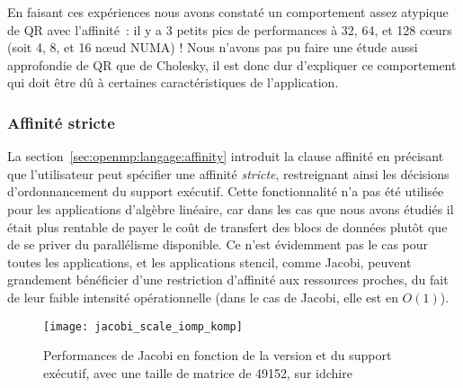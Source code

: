 En faisant ces expériences nous avons constaté un comportement assez atypique de QR avec l'affinité~: il y a 3 petits pics de performances à 32, 64, et 128 cœurs (soit 4, 8, et 16 nœud NUMA) !
Nous n'avons pas pu faire une étude aussi approfondie de QR que de Cholesky, il est donc dur d'expliquer ce comportement qui doit être dû à certaines caractéristiques de l'application.




\subsubsection{Affinité stricte}

La section~\ref{sec:openmp:langage:affinity} introduit la clause affinité en précisant que l'utilisateur peut spécifier une affinité \emph{stricte}, restreignant ainsi les décisions d'ordonnancement du support exécutif.
Cette fonctionnalité n'a pas été utilisée pour les applications d'algèbre linéaire, car dans les cas que nous avons étudiés il était plus rentable de payer le coût de transfert des blocs de données plutôt que de se priver du parallélisme disponible.
Ce n'est évidemment pas le cas pour toutes les applications, et les applications stencil, comme Jacobi, peuvent grandement bénéficier d'une restriction d'affinité aux ressources proches, du fait de leur faible intensité opérationnelle (dans le cas de Jacobi, elle est en $O(1)$).

\begin{figure}[ht]
  \centering
  \texttt{[image: jacobi\_scale\_iomp\_komp]}
  \caption{Performances de Jacobi en fonction de la version et du support exécutif, avec une taille de matrice de 49152, sur idchire}\label{fig:contribs:perf_eval:eval-jacobi}
\end{figure}

